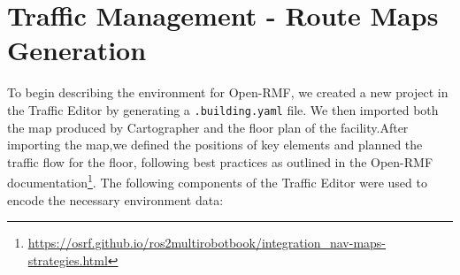 \section{Traffic Management - Route Maps Generation}
To begin describing the environment for Open-RMF, we created a new project in the Traffic Editor by generating a \texttt{.building.yaml} file. We then imported both the map produced by Cartographer and the floor plan of the facility.After importing the map,we defined the positions of key elements and planned the traffic flow for the floor, following best practices as outlined in the Open-RMF documentation\footnote{\href{https://osrf.github.io/ros2multirobotbook/integration\_nav-maps-strategies.html}{https://osrf.github.io/ros2multirobotbook/integration\_nav-maps-strategies.html}}. The following components of the Traffic Editor were used to encode the necessary environment data:
